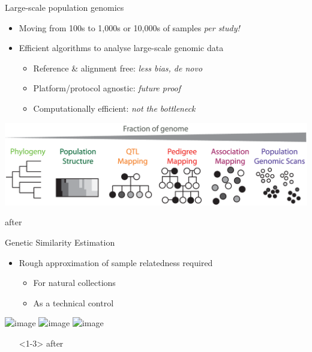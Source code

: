 \documentclass[t]{beamer}
\begin{document}

\begin{frame}{Large-scale population genomics}
  \begin{itemize}
    \item Moving from 100s to 1,000s or 10,000s of samples \emph{per study!}
    \item Efficient algorithms to analyse large-scale genomic data
    \begin{itemize}
      \item Reference \& alignment free: \textit{less bias, de novo}
      \item Platform/protocol agnostic: \textit{future proof}
      \item Computationally efficient: \textit{not the bottleneck}
    \end{itemize}
  \end{itemize}
  \begin{center}
    \includegraphics[width=\textwidth]{img/cross-scale.png}
  \end{center}
  \tiny{after \textcite{peterson_double_2012}}
\end{frame}



\begin{frame}{Genetic Similarity Estimation}
  \begin{itemize}
    \item Rough approximation of sample relatedness required
      \begin{itemize}
        \item For natural collections
        \item As a technical control
      \end{itemize}
  \end{itemize}
  \begin{center}
    \includegraphics<1>[width=\textwidth]{img/restruct-1}
    \includegraphics<2>[width=\textwidth]{img/restruct-2}
    \includegraphics<3>[width=\textwidth]{img/restruct-3}
    \begin{itemize}
      \item[]<1-3> \tiny{after \textcite{brachi_genome-wide_2011}}
    \end{itemize}
  \end{center}
\end{frame}
\end{document}
